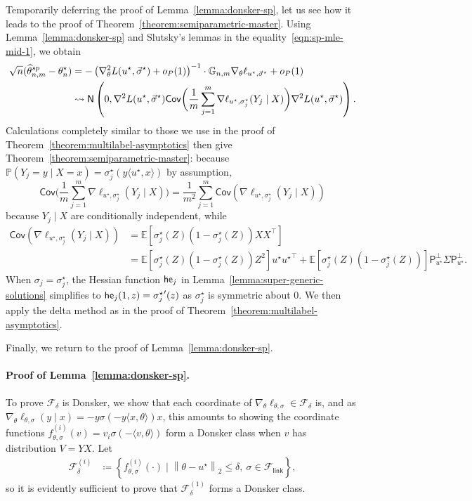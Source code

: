\documentclass[11pt]{article}
\newcommand{\cov}{\mathsf{Cov}}
\newcommand{\E}{\mathbb{E}}
\renewcommand{\P}{\mathbb{P}}
\newcommand{\mc}[1]{\mathcal{#1}}
\newcommand{\prn}[1]{\left({#1}\right)} %
\newcommand{\norm}[1]{\left\|{#1}\right\|} %
\newcommand{\what}[1]{\widehat{#1}}
\newcommand{\normal}{\mathsf{N}}
\newcommand{\sem}{^{\textup{sp}}}
\newcommand{\proj}{\mathsf{P}}
\newcommand{\projperp}{\proj_{u\opt}^\perp}
\newcommand{\Flink}{\mathcal{F}_{\mathsf{link}}}
\newcommand{\loss}{\ell}
\newcommand{\poploss}{L}
\newcommand{\ltwo}[1]{\norm{#1}_2} %
\newcommand{\<}{\langle} %
\renewcommand{\>}{\rangle}
\newcommand{\cd}{\rightsquigarrow}
\newcommand{\defeq}{\coloneqq}
\newcommand{\opt}{^\star}
\newcommand{\spe}{\what{\theta}\sem_{n,m}} %
\newcommand{\G}{\mathbb{G}}
\begin{document}
Temporarily deferring the proof of Lemma~\ref{lemma:donsker-sp}, let us see
how it leads to the proof of Theorem~\ref{theorem:semiparametric-master}.
Using Lemma~\ref{lemma:donsker-sp} and Slutsky's lemmas in the
equality~\eqref{eqn:sp-mle-mid-1}, we obtain
\begin{align*}
	\sqrt{n}(\spe - \theta_n\opt)
	& = 
	-\prn{\nabla_\theta^2 \poploss(u\opt, \vec{\sigma}\opt)  + o_P(1)}^{-1}
	\cdot \G_{n,m} \nabla_\theta \loss_{u\opt, \vec{\sigma}\opt}
	+ o_P(1) \\
	& \cd \normal\left(0,
	\nabla^2 L(u\opt, \vec{\sigma}\opt)
	\cov\bigg(\frac{1}{m}
	\sum_{j = 1}^m \nabla \loss_{u\opt, \sigma_j\opt}(Y_j \mid X)\bigg)
	\nabla^2 L(u\opt, \vec{\sigma}\opt)\right).
\end{align*}
Calculations completely similar to those we use in the proof of
Theorem~\ref{theorem:multilabel-asymptotics} then give
Theorem~\ref{theorem:semiparametric-master}: because $\P(Y_j = y \mid X = x)
= \sigma_j\opt(y \<u\opt, x\>)$ by assumption,
\begin{equation*}
	\cov\bigg(\frac{1}{m}
	\sum_{j = 1}^m \nabla \loss_{u\opt, \sigma_j\opt}(Y_j \mid X)\bigg)
	= \frac{1}{m^2} \sum_{j = 1}^m
	\cov(\nabla \loss_{u\opt, \sigma_j\opt}(Y_j \mid X))
\end{equation*}
because
$Y_j \mid X$ are conditionally independent, while
\begin{align*}
	\cov(\nabla \loss_{u\opt,\sigma_j\opt}(Y_j \mid X))
	& = \E[\sigma_j\opt(Z)(1 - \sigma_j\opt(Z)) XX^\top] \\
	& = \E[\sigma_j\opt(Z)(1 - \sigma_j\opt(Z)) Z^2]
	u\opt{u\opt}^\top
	+ \E[\sigma_j\opt(Z)(1 - \sigma_j\opt(Z))]
	\projperp \Sigma \projperp.
\end{align*}
When
$\sigma_j = \sigma_j\opt$, the Hessian function $\mathsf{he}_j$
in Lemma~\ref{lemma:super-generic-solutions}
simplifies to $\hessfunc_j(1, z) = {\sigma_j\opt}'(z)$ as
$\sigma_j\opt$ is symmetric about 0.
We then apply the delta method
as in the proof of Theorem~\ref{theorem:multilabel-asymptotics}.

Finally, we return to the proof of Lemma~\ref{lemma:donsker-sp}.

\paragraph{Proof of Lemma~\ref{lemma:donsker-sp}.}

\newcommand{\ball}{\mathbb{B}}
\newcommand{\Fflip}{\mc{F}_{\mathsf{flip}}}

To prove $\mathcal{F}_\delta$ is Donsker, we show that each coordinate of
$\nabla_{\theta} \loss_{\theta, \sigma} \in \mathcal{F}_\delta$ is, and as
$\nabla_\theta \loss_{\theta, \sigma} (y \mid x) = -y\sigma(-y\<x,
\theta\>)x$, this amounts to showing the coordinate functions $f_{\theta,
	\sigma}^{(i)}(v) = v_i\sigma(-\<v, \theta\>)$ form a Donsker class when
$v$ has distribution $V = YX$. Let
\begin{align*}
	\mathcal{F}_\delta^{(i)}
	& \defeq \left\{ f_{\theta, \sigma}^{(i)}(\cdot) \mid
	\ltwo{\theta - u\opt} \leq \delta, ~
	\sigma \in \Flink \right\},
\end{align*}
so it is evidently sufficient to prove
that $\mathcal{F}_\delta^{(1)}$ forms a Donsker class.
\end{document}
